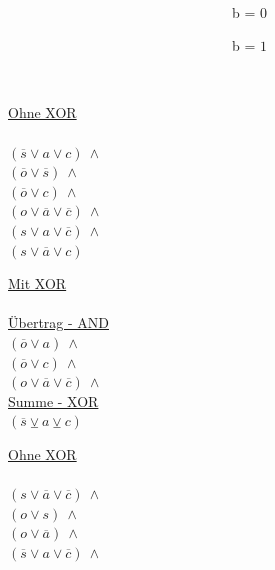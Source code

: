 \begin{figure}[!h]
  \centering
  \begin{minipage}[c]{0.3cm}
    ~
  \end{minipage}
  \begin{minipage}[c]{7.1cm}
    ~~~~~~~~~~~~~~~~~~~~~~~~~~~~~~~~b = $0$
  \end{minipage}
  \begin{minipage}[c]{7cm}
    ~~~~~~~~~~~~~~~~~~~~~~~~~~~~~~~~b = $1$
  \end{minipage}
  \begin{minipage}[l]{0.4cm}
    ~
  \end{minipage}
  \begin{minipage}[l]{3.5cm}
    \underline{Ohne XOR}\\
    ~\\
    $ (\overline{s} \vee a \vee c) ~ \wedge $\\
    $ (\overline{o} \vee \overline{s}) ~ \wedge $\\
    $ (\overline{o} \vee c) ~ \wedge $\\
    $ (o \vee \overline{a} \vee \overline{c}) ~ \wedge $\\
    $ (s \vee a \vee \overline{c}) ~ \wedge $\\
    $ (s \vee \overline{a} \vee c) $
  \end{minipage}
  \begin{minipage}[l]{3.5cm}
    \underline{Mit XOR}\\
    ~\\
    \underline{Übertrag - AND}\\
    $ (\overline{o} \vee a) ~ \wedge $\\
    $ (\overline{o} \vee c) ~ \wedge $\\
    $ (o \vee \overline{a} \vee \overline{c}) ~ \wedge $\\
    \underline{Summe - XOR}\\
    $ (\overline{s} \veebar a \veebar c) $
  \end{minipage}
  \begin{minipage}[l]{3.5cm}
    \underline{Ohne XOR}\\
    ~\\
    $ (s \vee \overline{a} \vee \overline{c}) ~ \wedge $\\
    $ (o \vee s) ~ \wedge $\\
    $ (o \vee \overline{a}) ~ \wedge $\\
    $ (\overline{s} \vee a \vee \overline{c}) ~ \wedge $\\

\end{minipage}
\end{figure}
